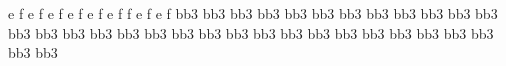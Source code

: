 \grg\qlc\etn
\echoN\qla\enotes\xbarre
\notes\grg\qlp e\etn
\pince f\cc\etn
\grg\qlb\etn
\echoN\qla\enotes\xbarre
\notes\grg\qlp e\etn
\pince f\cc\etn
\grg\qlc\etn
\echoN\qla\enotes\xbarre
\notes\grg\qlp e\etn
\pince f\cc\etn
\grg\qlb\etn
{}\qlh\enotes\xbarre
\notes\qlp e\etn
\pince f\cc\etn
\grg\qlb\etn
\echoN\qla\enotes\setdoublebar\suspmorceau
%
\reprmorceau
\setdoublebar\xbarre
\notes\grg\qlp e\etn
\pince f\cc\etn
\grg\qlc\etn
{}\qlh\enotes\xbarre
\notes\qlp e\etn
\pince f\cc\etn
\grg\qlc\etn
\pince f\qle\enotes\xbarre
\notes\grg\qlp e\etn
\pince f\cc\etn
\grg\qlb\etn
{}\qlh\enotes\xbarre
\notes\qlp e\etn
\pince f\cc\etn
\grg\qlb\etn
\echoN\qla\enotes\setdoublebar\suspmorceau
%
%
\reprmorceau
\setdoublebar\xbarre
\notes\grg\bcc bb3{\be{}}\bh\etn
\bcc bb3{\bc\echoN}\ba{}\enotes\xbarre
\notes\grg\bcc bb3{\be{}}\bh\etn
\bcc bb3{\bb\echoN}\ba{}\enotes\xbarre
\notes\grg\bcc bb3{\be{}}\bh\etn
\bcc bb3{\bc{}}\bh\enotes\xbarre
\notes\bcc bb3{\bf{}}\bh\etn
\bcc bb3{\bc\echoN}\ba{}\enotes\xbarre
\notes\grg\bcc bb3{\be{}}\bh\etn
\bcc bb3{\bc{}}\bh\enotes\xbarre
\notes\bcc bb3{\bf{}}\bh\etn
\bcc bb3{\bb\echoN}\ba{}\enotes\setdoublebar\suspmorceau
%
\reprmorceau
\setdoublebar\xbarre
\notes\grg\bcc bb3{\be{}}\bh\etn
\bcc bb3{\bc{}}\bh\enotes\xbarre
\notes\bcc bb3{\bf{}}\bh\etn
\bcc bb3{\bc\echoN}\ba{}\enotes\xbarre
\notes\grg\bcc bb3{\be{}}\bh\etn
\bcc bb3{\bb\echoN}\ba{}\enotes\xbarre
\notes\grg\bcc bb3{\be{}}\bh\etn
\bcc bb3{\bc\echoN}\ba{}\enotes\xbarre
\notes\grg\bcc bb3{\be{}}\bh\etn
\bcc bb3{\bc{}}\bh\enotes\xbarre
\notes\bcc bb3{\bf{}}\bh\etn
\bcc bb3{\bb\echoN}\ba{}\enotes\setdoublebar\suspmorceau
%
\reprmorceau
\setdoublebar\xbarre
\notes\grg\bcc bb3{\be{}}\bh\etn
\bcc bb3{\bc{}}\bh\enotes\xbarre
\notes\bcc bb3{\bf{}}\bh\etn
\bcc bb3{\bc{}}\bh\enotes\xbarre
\notes\bcc bb3{\be{}}\bh\etn
\bcc bb3{\bc{}}\bh\enotes\xbarre
\notes\bcc bb3{\bf{}}\bh\etn
\bcc bb3{\bb\echoN}\ba{}\enotes\setdoublebar\suspmorceau
